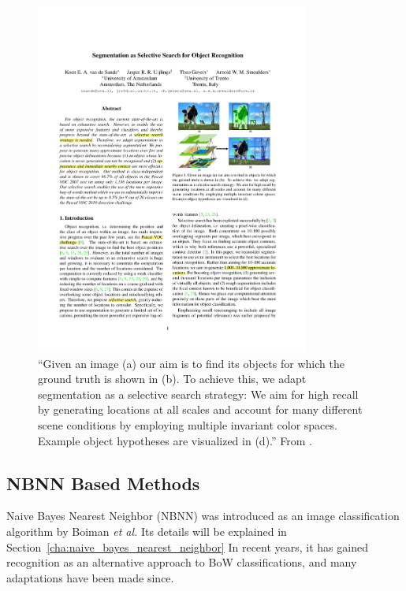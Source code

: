 \begin{figure}[hbt]
    \centering
    \includegraphics[width=0.8\textwidth]{LocByDet}
    \caption{``Given an image (a) our aim is to find its objects for which the ground truth is shown in (b). To achieve this, we adapt segmentation as a selective search strategy: We aim for high recall by generating locations at all scales and account for many different scene conditions by employing multiple invariant color spaces. Example object hypotheses are visualized in (d).'' From \cite{van2011segmentation}.}
    \label{fig:locbydet}
\end{figure}


\subsection{NBNN Based Methods} %
\label{sec:nbnn_based_methods}

Naive Bayes Nearest Neighbor (NBNN) was introduced as an image classification algorithm by Boiman \emph{et al.} \cite{boiman2008defense} Its details will be explained in Section~\ref{cha:naive_bayes_nearest_neighbor} In recent years, it has gained recognition as an alternative approach to BoW classifications, and many adaptations have been made since. \cite{becker2012codebook, behmo2010towards, mccann2012local, timofte2012iterative, tuytelaars2011nbnn, wang2011improved}

